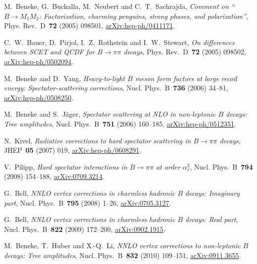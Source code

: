 M.~Beneke, G.~Buchalla, M.~Neubert and C.~T.~Sachrajda, \emph{Comment on ``$B\to M_1M_2$: Factorization, charming penguins, strong phases, and polarization''}, Phys. Rev.~D~\textbf{72} (2005) \mbox{098501}, \href{https://arxiv.org/abs/hep-ph/0411171}{arXiv:hep-ph/0411171}.

C.~W.~Bauer, D.~Pirjol, I.~Z.~Rothstein and I.~W.~Stewart, \emph{On differences between SCET and QCDF for $B\to\pi\pi$ decays}, Phys. Rev.~D~\textbf{72} (2005) \mbox{098502}, \href{https://arxiv.org/abs/hep-ph/0502094}{arXiv:hep-ph/0502094}.

M.~Beneke and D.~Yang, \emph{Heavy-to-light $B$ meson form factors at large recoil energy: Spectator-scattering corrections}, Nucl. Phys.~B~\textbf{736} (2006) \mbox{34--81}, \href{https://arxiv.org/abs/hep-ph/0508250}{arXiv:hep-ph/0508250}.

M.~Beneke and S.~J\"ager, \emph{Spectator scattering at NLO in non-leptonic $B$ decays: Tree amplitudes}, Nucl. Phys.~B~\textbf{751} (2006) \mbox{160--185}, \href{https://arxiv.org/abs/hep-ph/0512351}{arXiv:hep-ph/0512351}.

N.~Kivel, \emph{Radiative corrections to hard spectator scattering in $B\to\pi\pi$ decays}, JHEP~\textbf{05} (2007) \mbox{019}, \href{https://arxiv.org/abs/hep-ph/0608291}{arXiv:hep-ph/0608291}.

V.~Pilipp, \emph{Hard spectator interactions in $B\to\pi\pi$ at order $\alpha_s^2$}, Nucl. Phys.~B~\textbf{794} (2008) \mbox{154--188}, \href{https://arxiv.org/abs/0709.3214}{arXiv:0709.3214}.

G.~Bell, \emph{NNLO vertex corrections in charmless hadronic $B$ decays: Imaginary part}, Nucl. Phys.~B~\textbf{795} (2008) \mbox{1--26}, \href{https://arxiv.org/abs/0705.3127}{arXiv:0705.3127}.

G.~Bell, \emph{NNLO vertex corrections in charmless hadronic $B$ decays: Real part}, Nucl. Phys.~B~\textbf{822} (2009) \mbox{172--200}, \href{https://arxiv.org/abs/0902.1915}{arXiv:0902.1915}.

M.~Beneke, T.~Huber and X.-Q.~Li, \emph{NNLO vertex corrections to non-leptonic $B$ decays: Tree amplitudes}, Nucl. Phys.~B~\textbf{832} (2010) \mbox{109--151}, \href{https://arxiv.org/abs/0911.3655}{arXiv:0911.3655}.

